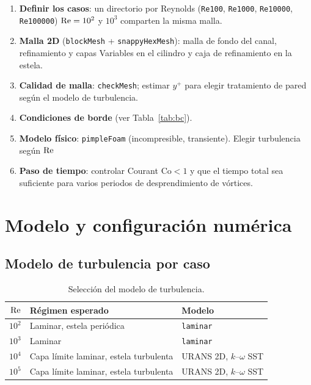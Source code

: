 \begin{enumerate}[label=\textbf{\arabic*.}]
  \item \textbf{Definir los casos}: un directorio por Reynolds (\texttt{Re100}, \texttt{Re1000}, \texttt{Re10000}, \texttt{Re100000}) $\mathrm{Re}=10^2$ y $10^3$ comparten la misma malla.
  \item \textbf{Malla 2D} (\texttt{blockMesh} + \texttt{snappyHexMesh}): malla de fondo del canal, refinamiento y capas Variables en el cilindro y caja de refinamiento en la estela.
  \item \textbf{Calidad de malla}: \texttt{checkMesh}; estimar $y^+$ para elegir tratamiento de pared según el modelo de turbulencia.
  \item \textbf{Condiciones de borde} (ver Tabla~\ref{tab:bc}).
  \item \textbf{Modelo físico}: \texttt{pimpleFoam} (incompresible, transiente). Elegir turbulencia según $\mathrm{Re}$
  \item \textbf{Paso de tiempo}: controlar Courant $\mathrm{Co} < 1$ y que el tiempo total sea suficiente para varios periodos de desprendimiento de vórtices.
\end{enumerate}

\section{Modelo y configuración numérica}
\label{sec:modelo}

\subsection{Modelo de turbulencia por caso}
\begin{table}[H]
\centering
\begin{tabular}{rll}
\toprule
$\mathrm{Re}$ & Régimen esperado & Modelo \\
\midrule
$10^{2}$ & Laminar, estela periódica  & \texttt{laminar} \\
$10^{3}$ & Laminar& \texttt{laminar} \\
$10^{4}$ & Capa límite laminar, estela turbulenta & URANS 2D, $k$--$\omega$ SST \\
$10^{5}$ & Capa límite laminar, estela turbulenta & URANS 2D, $k$--$\omega$ SST \\
\bottomrule
\end{tabular}
\caption{Selección del modelo de turbulencia.}
\end{table}


